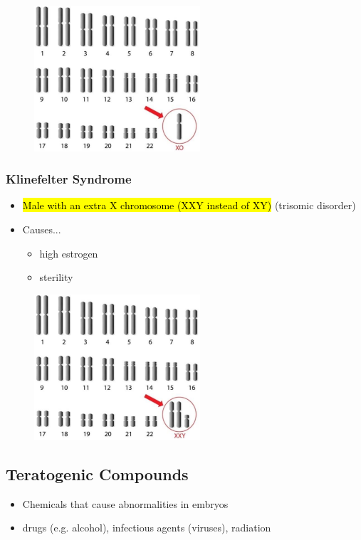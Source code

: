 \documentclass[a4paper,12pt]{article}
\begin{document}
\begin{figure}[H]
    \centering
    \includegraphics[width=0.55\textwidth]{turners}
\end{figure}

\subsubsection{Klinefelter Syndrome}
\begin{itemize}
    \item{\hl{Male with an extra \female X chromosome (XXY instead of XY)} (trisomic disorder)}
    \item{
            Causes...
            \begin{itemize}
                \item{high estrogen}
                \item{sterility}
            \end{itemize}
        }
\end{itemize}

\begin{figure}[H]
    \centering
    \includegraphics[width=0.55\textwidth]{klinefelter}
\end{figure}

\subsection{Teratogenic Compounds}
\begin{itemize}
    \item{Chemicals that cause abnormalities in embryos}
    \item{drugs (e.g. alcohol), infectious agents (viruses), radiation}
\end{itemize}
\end{document}

